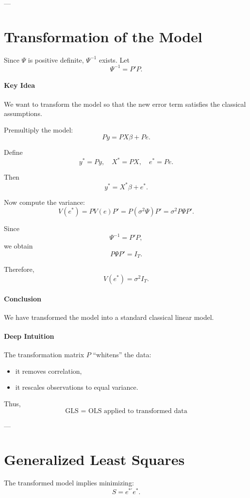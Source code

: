---

\section{Transformation of the Model}

Since $\Psi$ is positive definite, $\Psi^{-1}$ exists. Let
\[
\Psi^{-1} = P'P.
\]

\paragraph{Key Idea}
We want to transform the model so that the new error term satisfies the classical assumptions.

Premultiply the model:
\[
Py = PX\beta + Pe.
\]

Define
\[
y^* = Py, \quad X^* = PX, \quad e^* = Pe.
\]

Then
\[
y^* = X^*\beta + e^*.
\]

Now compute the variance:
\[
V(e^*) = P V(e) P' = P(\sigma^2 \Psi)P' = \sigma^2 P\Psi P'.
\]

Since
\[
\Psi^{-1} = P'P,
\]
we obtain
\[
P\Psi P' = I_T.
\]

Therefore,
\[
V(e^*) = \sigma^2 I_T.
\]

\paragraph{Conclusion}
We have transformed the model into a standard classical linear model.

\paragraph{Deep Intuition}
The transformation matrix $P$ “whitens” the data:
\begin{itemize}
    \item it removes correlation,
    \item it rescales observations to equal variance.
\end{itemize}

Thus,
\[
\text{GLS = OLS applied to transformed data}
\]

---

\section{Generalized Least Squares}

The transformed model implies minimizing:
\[
S = e^{*'} e^*.
\]

